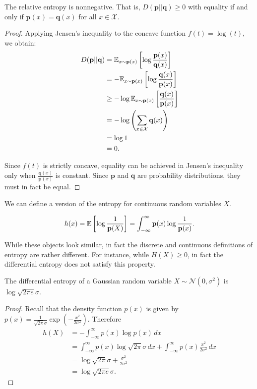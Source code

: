 \documentclass[13pt]{article}
\newcommand{\p}{\mathbf{p}}
\newcommand{\q}{\mathbf{q}}
\newcommand{\N}{\mathcal{N}}
\begin{document}
\begin{lemma}
  The relative entropy is nonnegative.  That is, $D(\p || \q) \geq 0$ with equality if and only if $\p(x) = \q(x)$ for all $x \in \mathcal{X}$.
\end{lemma}

\begin{proof}
  Applying Jensen's inequality to the concave function $f(t) = \log(t)$, we obtain:
  \begin{align*}
    D(\p || \q) &= \EE_{x \sim \p(x)} \left[ \log \frac{\p(x)}{\q(x)} \right] \\
    &=  - \EE_{x \sim \p(x)} \left[ \log \frac{\q(x)}{\p(x)} \right] \\
    &\geq - \log \EE_{x \sim \p(x)} \left[ \frac{\q(x)}{\p(x)} \right] \\
    &= - \log \left( \sum_{x \in \mathcal{X}} \q(x) \right) \\
    &= \log 1 \\
    &= 0.
  \end{align*}

  Since $f(t)$ is strictly concave, equality can be achieved in Jensen's inequality only when $\frac{\q(x)}{\p(x)}$ is constant.  Since $\p$ and $\q$ are probability distributions, they must in fact be equal.
\end{proof}

We can define a version of the entropy for continuous random variables $X$. \\

\begin{definition}
\begin{align*}
  h(x) = \EE \left[ \log \frac{1}{\p(X)} \right] = \int_{-\infty}^{\infty} \p(x) \log \frac{1}{\p(x)}.
\end{align*}
\end{definition}

While these objects look similar, in fact the discrete and continuous definitions of entropy are rather different.  For instance, while $H(X) \geq 0$, in fact the differential entropy does not satisfy this property. \\

\begin{prop}
  The differential entropy of a Gaussian random variable $X \sim \N(0, \sigma^2)$ is $\log \sqrt{2 \pi e} \sigma$. \\
\end{prop}

\begin{proof} 
  Recall that the density function $p(x)$ is given by $p(x) = \frac{1}{\sqrt{2 \pi } \sigma} \exp \left( - \frac{x^2}{2 \sigma^2} \right)$.  Therefore
  \begin{align*}
    h(X) &= - \int_{-\infty}^{\infty} p(x) \log p(x) \, dx \\
    &= \int_{-\infty}^{\infty} p(x) \log \sqrt{2 \pi} \sigma \, dx + \int_{- \infty}^{\infty} p(x) \frac{x^2}{2 \sigma^2} \, dx \\
    &= \log \sqrt{2 \pi} \sigma + \frac{\sigma^2}{2 \sigma^2} \\
    &= \log \sqrt{2 \pi e} \sigma.
  \end{align*}
\end{proof}
\end{document}
